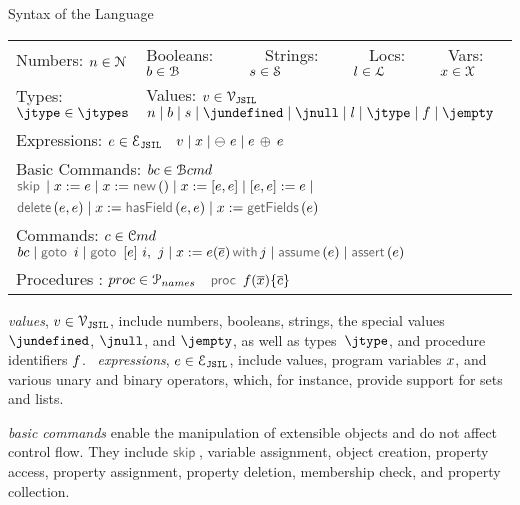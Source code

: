 \vspace{5pt}
\begin{display}{Syntax of the \jsil Language}{
\begin{tabular}{lllll}
	 Numbers: $n \in \mathcal{N}$ &  Booleans: $b \in \mathcal{B}$ & \  \ Strings: $s \in {\mathcal S}$ & \  \ Locs: $l \in {\mathcal L}$ & \  Vars: $x \in \mathcal{X}$ \\[0.1cm]
	Types: $\jtype \in \jtypes$ & \multicolumn{4}{l}{Values: $v \in \mathcal{V}_{\mathtt{JSIL}}$  \ $\jnumber \mid \jbool \mid \jstring \mid  \jundefined \mid \jnull \mid \loc \mid \jtype \mid \pid \mid \jempty$} \\[0.1cm]
\multicolumn{5}{l}{Expressions: $e \in \mathcal{E}_{\mathtt{JSIL}}$  \ $v \mid x \mid \ominus\ e \mid e \, \oplus_{} \, e $} \\[0.1cm]
	\multicolumn{5}{l}{Basic Commands: $bc \in \mathcal{B}cmd$ \ $\jsilskip \mid \jvar := \jsilexpr  \mid \jvar := \jsilnew() \mid \jvar := [\jsilexpr, \jsilexpr] \mid [\jsilexpr, \jsilexpr] := \jsilexpr \mid$} \\[0.1cm]
	\multicolumn{5}{l}{\hspace{2.8cm} $\jsildelete(\jsilexpr, \jsilexpr) \mid \jvar := \hasfield(\jsilexpr, \jsilexpr) \mid \jvar := \getfields(\jsilexpr)$} \\[0.1cm]
	\multicolumn{5}{l}{Commands: $c \in \mathcal{C}md$  \ $ \bcmd \mid \goto \ i \mid  \ifgoto{\jsilexpr}{i}{j} \mid \jsilcall{\jvar}{\jsilexpr}{\jvec{\jsilexpr}}{j} 
	         \mid \assume(\jsilexpr) \mid \assert(\jsilexpr)$} \\[0.1cm]
	\multicolumn{5}{l}{Procedures : $proc \in \mathcal{P}_{names}$  \ $\procedure{\pid}{\jvec{\jvar}}{\jvec{\jcmd}}$}
 \end{tabular}}
\end{display}

\vspace{5pt}
\noindent \jsil \emph{values}, $v \in \mathcal{V}_{\mathtt{JSIL}}$, include numbers, booleans, strings, the special values $\jundefined$, $\jnull$, and $\jempty$, as well as types~$\jtype$, and procedure identifiers $f$.
\jsil~\emph{expressions}, $e \in \mathcal{E}_{\mathtt{JSIL}}$, include \jsil values, \jsil program variables $x$, and various unary and binary operators, which, for instance, provide support for sets and lists. 

\jsil \emph{basic commands} enable the manipulation of extensible objects and do not affect control flow. 
They include $\jsilskip$, variable assignment, object creation, property access, property assignment, property deletion, membership check, and property collection. 

